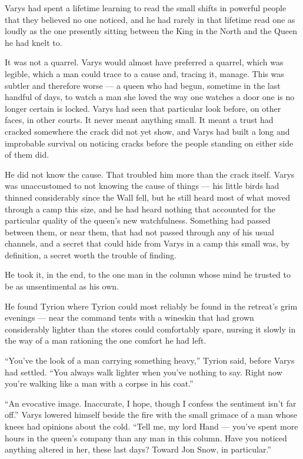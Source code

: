 Varys had spent a lifetime learning to read the small shifts in powerful people that they believed no one noticed, and he had rarely in that lifetime read one as loudly as the one presently sitting between the King in the North and the Queen he had knelt to.

It was not a quarrel. Varys would almost have preferred a quarrel, which was legible, which a man could trace to a cause and, tracing it, manage. This was subtler and therefore worse — a queen who had begun, sometime in the last handful of days, to watch a man she loved the way one watches a door one is no longer certain is locked. Varys had seen that particular look before, on other faces, in other courts. It never meant anything small. It meant a trust had cracked somewhere the crack did not yet show, and Varys had built a long and improbable survival on noticing cracks before the people standing on either side of them did.

He did not know the cause. That troubled him more than the crack itself. Varys was unaccustomed to not knowing the cause of things — his little birds had thinned considerably since the Wall fell, but he still heard most of what moved through a camp this size, and he had heard nothing that accounted for the particular quality of the queen’s new watchfulness. Something had passed between them, or near them, that had not passed through any of his usual channels, and a secret that could hide from Varys in a camp this small was, by definition, a secret worth the trouble of finding.

He took it, in the end, to the one man in the column whose mind he trusted to be as unsentimental as his own.

\sceneBreak

He found Tyrion where Tyrion could most reliably be found in the retreat’s grim evenings — near the command tents with a wineskin that had grown considerably lighter than the stores could comfortably spare, nursing it slowly in the way of a man rationing the one comfort he had left.

“You’ve the look of a man carrying something heavy,” Tyrion said, before Varys had settled. “You always walk lighter when you’ve nothing to say. Right now you’re walking like a man with a corpse in his coat.”

“An evocative image. Inaccurate, I hope, though I confess the sentiment isn’t far off.” Varys lowered himself beside the fire with the small grimace of a man whose knees had opinions about the cold. “Tell me, my lord Hand — you’ve spent more hours in the queen’s company than any man in this column. Have you noticed anything altered in her, these last days? Toward Jon Snow, in particular.”

